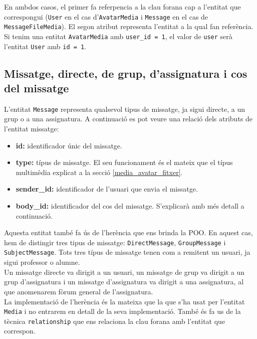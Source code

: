     En ambdos casos, el primer fa referpencia a la clau forana cap a l'entitat que correspongui (\texttt{User} en el cas d'\texttt{AvatarMedia} i \texttt{Message} en el cas de \texttt{MessageFileMedia}). El segon atribut representa l'entitat a la qual fan referència. Si tenim una entitat \texttt{AvatarMedia} amb \texttt{user\_id = 1}, el valor de \texttt{user} serà l'entitat \texttt{User} amb \texttt{id = 1}.\\
   
    \subsection{Missatge, directe, de grup, d'assignatura i cos del missatge}\label{missatge_directe_grup_assignatura}
    
    L'entitat \texttt{Message} representa qualsevol tipus de missatge, ja sigui directe, a un grup o a una assignatura. A continuació es pot veure una relació dels atributs de l'entitat missatge:
    
    \begin{itemize}
    	\item \textbf{id:} identificador únic del missatge.
    	\item \textbf{type:} típus de missatge. El seu funcionament és el mateix que el típus multimèdia explicat a la secció \ref{media_avatar_fitxer}.
    	\item \textbf{sender\_id:} identificador de l'usuari que envia el missatge. 
    	\item \textbf{body\_id:} identificador del cos del missatge. S'explicarà amb més detall a continuació.
    \end{itemize}
    
     Aquesta entitat també fa ús de l'herència que ens brinda la \ac{POO}. En aquest cas, hem de distingir tres tipus de missatge: \texttt{DirectMessage}, \texttt{GroupMessage} i \texttt{SubjectMessage}. Tots tres típus de missatge tenen com a remitent un usuari, ja sigui professor o alumne. \\
     
     Un missatge directe va dirigit a un usuari, un missatge de grup va dirigit a un grup d'assignatura i un missatge d'assignatura va dirigit a una assignatura, al que anomenarem fòrum general de l'assignatura. \\
    
   	La implementació de l'herència és la mateixa que la que s'ha usat per l'entitat \texttt{Media} i no entrarem en detall de la seva implementació. També és fa us de la tècnica \texttt{relationship} que ens relaciona la clau forana amb l'entitat que correspon. \\
   	
